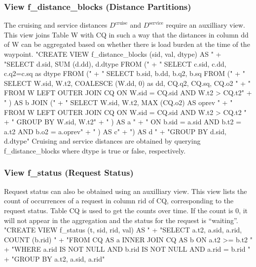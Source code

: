 \documentclass{article}
\def\nwendcode{\endtrivlist \endgroup}      %
\let\nwdocspar=\par
\theoremstyle{definition}                   %
\begin{document}
\subsubsection{View f\_distance\_blocks (Distance Partitions)}
The cruising and service distances $D^\textrm{cruise}$ and $D^\textrm{service}$
require an auxilliary view. This view joins Table W with
CQ in such a way that the distances in column \textsf{dd} of W
can be aggregated based on whether there is load burden at the time of the
waypoint.
\nwenddocs{}\endmoddef{}
"CREATE VIEW f_distance_blocks (sid, val, dtype) AS "
  + "SELECT d.sid, SUM (d.dd), d.dtype FROM ("
  + "  SELECT c.sid, c.dd, c.q2=c.sq as dtype FROM ("
  + "    SELECT b.sid, b.dd, b.q2, b.sq FROM ("
  + "      SELECT W.sid, W.t2, COALESCE (W.dd, 0) as dd, CQ.q2, CQ.sq, CQ.o2 "
  + "      FROM W LEFT OUTER JOIN CQ ON W.sid = CQ.sid AND W.t2 > CQ.t2"
  + "    ) AS b JOIN ("
  + "      SELECT W.sid, W.t2, MAX (CQ.o2) AS oprev "
  + "      FROM W LEFT OUTER JOIN CQ ON W.sid = CQ.sid AND W.t2 > CQ.t2 "
  + "      GROUP BY W.sid, W.t2"
  + "    ) AS a "
  + "    ON b.sid = a.sid AND b.t2 = a.t2 AND b.o2 = a.oprev"
  + "  ) AS c"
  + ") AS d "
  + "GROUP BY d.sid, d.dtype"
\nwendcode{}Cruising and service distances are obtained by querying
f\_distance\_blocks where \textsf{dtype} is true or false, respectively.

\subsubsection{View f\_status (Request Status)}
Request status can also be obtained using an auxilliary view.  This view lists
the count of occurrences of a request in column \textsf{rid} of CQ,
corresponding to the request status.  Table CQ is used to get the counts over
time.  If the count is 0, it will not appear in the aggregation and the status
for the request is ``waiting''.
\nwenddocs{}\endmoddef{}
"CREATE VIEW f_status (t, sid, rid, val) AS "
  + "SELECT a.t2, a.sid, a.rid, COUNT (b.rid) "
  + "FROM CQ AS a INNER JOIN CQ AS b ON a.t2 >= b.t2 "
  + "WHERE a.rid IS NOT NULL AND b.rid IS NOT NULL AND a.rid = b.rid "
  + "GROUP BY a.t2, a.sid, a.rid"
\nwendcode{}\nwdocspar
\end{document}
